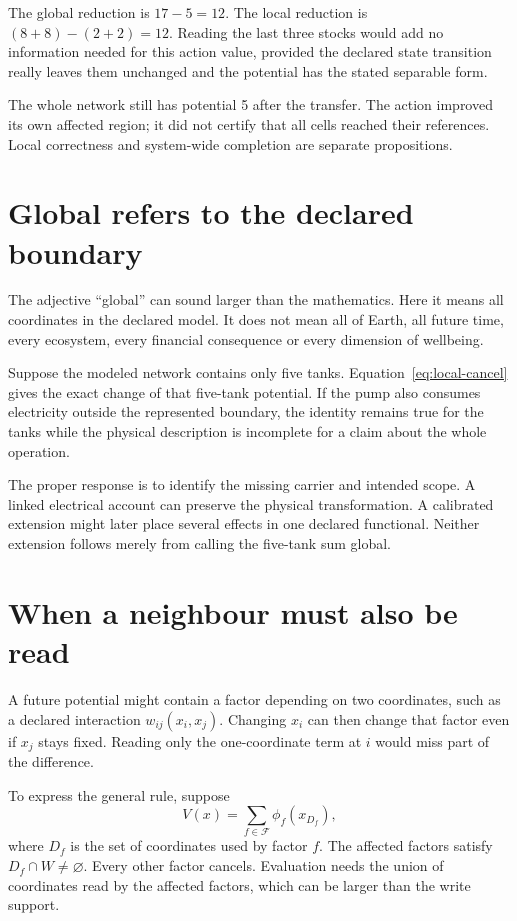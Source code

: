 The global reduction is $17-5=12$. The local reduction is $(8+8)-(2+2)=12$. Reading the last three stocks would add no information needed for this action value, provided the declared state transition really leaves them unchanged and the potential has the stated separable form.

The whole network still has potential 5 after the transfer. The action improved its own affected region; it did not certify that all cells reached their references. Local correctness and system-wide completion are separate propositions.


\section{Global refers to the declared boundary}
The adjective ``global'' can sound larger than the mathematics. Here it means all coordinates in the declared model. It does not mean all of Earth, all future time, every ecosystem, every financial consequence or every dimension of wellbeing.

Suppose the modeled network contains only five tanks. Equation~\eqref{eq:local-cancel} gives the exact change of that five-tank potential. If the pump also consumes electricity outside the represented boundary, the identity remains true for the tanks while the physical description is incomplete for a claim about the whole operation.

The proper response is to identify the missing carrier and intended scope. A linked electrical account can preserve the physical transformation. A calibrated extension might later place several effects in one declared functional. Neither extension follows merely from calling the five-tank sum global.

\section{When a neighbour must also be read}
A future potential might contain a factor depending on two coordinates, such as a declared interaction $w_{ij}(x_i,x_j)$. Changing $x_i$ can then change that factor even if $x_j$ stays fixed. Reading only the one-coordinate term at $i$ would miss part of the difference.

To express the general rule, suppose
\begin{equation}
 V(x)=\sum_{f\in\mathcal F}\phi_f(x_{D_f}),
\end{equation}
where $D_f$ is the set of coordinates used by factor $f$. The affected factors satisfy $D_f\cap W\ne\varnothing$. Every other factor cancels. Evaluation needs the union of coordinates read by the affected factors, which can be larger than the write support.

